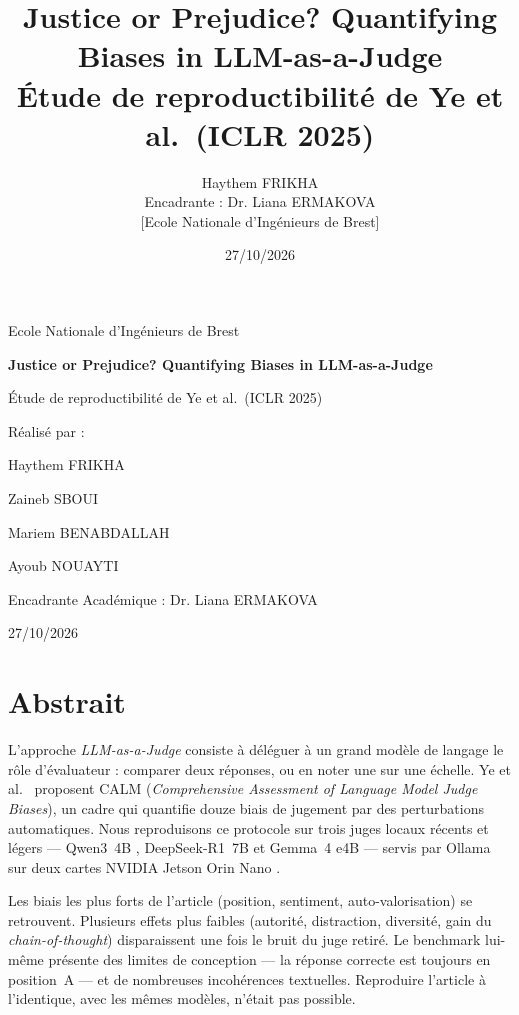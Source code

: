 \documentclass[a4paper,11pt]{report}
\title{Justice or Prejudice? Quantifying Biases in LLM-as-a-Judge\\
\large Étude de reproductibilité de Ye et al.\ (ICLR 2025)}
\author{Haythem FRIKHA\\[0.4em]
\small Encadrante : Dr. Liana ERMAKOVA\\
\small [Ecole Nationale d'Ingénieurs de Brest]}
\date{27/10/2026}
\begin{document}
\begin{titlepage}
  \centering
  \vspace*{1.5cm}
  {\large Ecole Nationale d'Ingénieurs de Brest\par}
  \vspace{1.8cm}
  {\LARGE\bfseries Justice or Prejudice? Quantifying Biases in LLM-as-a-Judge\par}
  \vspace{0.6cm}
  {\Large Étude de reproductibilité de Ye et al.\ (ICLR 2025)\par}
  \vspace{1.6cm}
      Réalisé par :
      
        {\large Haythem FRIKHA\par}
        {\large Zaineb SBOUI\par}
        {\large Mariem BENABDALLAH\par}
        {\large Ayoub NOUAYTI\par}
  \vspace{0.5cm}
  {\large Encadrante Académique : Dr. Liana ERMAKOVA\par}
  \vfill
  {\large 27/10/2026\par}
\end{titlepage}

\cleardoublepage
{}
\chapter*{Abstrait}

L'approche \emph{LLM-as-a-Judge} consiste à déléguer à un grand modèle de langage le rôle d'évaluateur : comparer deux réponses, ou en noter une sur une échelle. Ye et al.\ \cite{ye2025justice} proposent CALM (\emph{Comprehensive Assessment of Language Model Judge Biases}), un cadre qui quantifie douze biais de jugement par des perturbations automatiques. Nous reproduisons ce protocole sur trois juges locaux récents et légers --- Qwen3~4B \cite{qwen3technical}, DeepSeek-R1~7B \cite{deepseekr1} et Gemma~4 e4B \cite{ollamagemma4} --- servis par Ollama \cite{ollama} sur deux cartes NVIDIA Jetson Orin Nano \cite{jetsonorin}.

Les biais les plus forts de l'article (position, sentiment, auto-valorisation) se retrouvent. Plusieurs effets plus faibles (autorité, distraction, diversité, gain du \emph{chain-of-thought}) disparaissent une fois le bruit du juge retiré. Le benchmark lui-même présente des limites de conception --- la réponse correcte est toujours en position~A --- et de nombreuses incohérences textuelles. Reproduire l'article à l'identique, avec les mêmes modèles, n'était pas possible.
\end{document}
